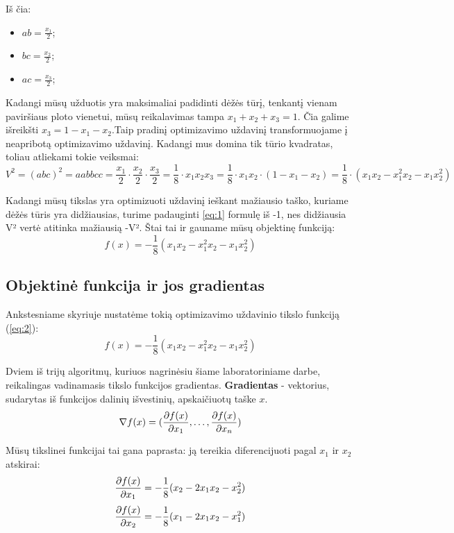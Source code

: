 \documentclass{article}
\begin{document}
Iš čia:
\begin{itemize}
    \item $ab = \frac{x_{1}}{2}$;
    \item $bc = \frac{x_{2}}{2}$;
    \item $ac = \frac{x_{3}}{2}$;
\end{itemize}

Kadangi mūsų užduotis yra maksimaliai padidinti dėžės tūrį, tenkantį vienam paviršiaus ploto vienetui, mūsų reikalavimas tampa $x_{1} + x_{2} + x_{3} = 1$. Čia galime išreikšti $x_{3} = 1 - x_{1} - x_{2}$.Taip pradinį optimizavimo uždavinį transformuojame į neapribotą optimizavimo uždavinį. Kadangi mus domina tik tūrio kvadratas, toliau atliekami tokie veiksmai:
\begin{equation}\label{eq:1}
    V^2 = (abc)^2 = aabbcc = \frac{x_{1}}{2}\cdot \frac{x_{2}}{2}\cdot \frac{x_{3}}{2} = \frac{1}{8}\cdot x_{1}x_{2}x_{3} = \frac{1}{8}\cdot x_{1}x_{2}\cdot (1-x_{1}-x_{2}) = \frac{1}{8}\cdot (x_{1}x_{2}-x_{1}^2x_{2}-x_{1}x_{2}^2)
\end{equation}

Kadangi mūsų tikslas yra optimizuoti uždavinį ieškant mažiausio taško, kuriame dėžės tūris yra didžiausias, turime padauginti \ref{eq:1} formulę iš -1, nes didžiausia V² vertė atitinka mažiausią -V². Štai tai ir gauname mūsų objektinę funkciją:
\begin{equation}\label{eq:2}
    f(x) = -\frac{1}{8}(x_{1}x_{2}-x_{1}^2x_{2}-x_{1}x_{2}^2)
\end{equation}
\subsection{Objektinė funkcija ir jos gradientas}
Ankstesniame skyriuje nustatėme tokią optimizavimo uždavinio tikslo funkciją (\ref{eq:2}):
\begin{equation*}
    f(x) = -\frac{1}{8}(x_{1}x_{2}-x_{1}^2x_{2}-x_{1}x_{2}^2)
\end{equation*}

Dviem iš trijų algoritmų, kuriuos nagrinėsiu šiame laboratoriniame darbe, reikalingas vadinamasis tikslo funkcijos gradientas. \textbf{Gradientas} - vektorius, sudarytas iš funkcijos dalinių išvestinių,
apskaičiuotų taške $x$.
\begin{equation*}
    \nabla f(x) = (\pdv{f(x)}{x_{1}},\dots,\pdv{f(x)}{x_{n}})
\end{equation*}

Mūsų tikslinei funkcijai tai gana paprasta: ją tereikia diferencijuoti pagal $x_{1}$ ir $x_{2}$ atskirai:
\begin{equation*}
    \pdv{f(x)}{x_{1}} = -\frac{1}{8}(x_{2}-2x_{1}x_{2}-x_{2}^2)
\end{equation*}
\begin{equation*}
    \pdv{f(x)}{x_{2}} = -\frac{1}{8}(x_{1}-2x_{1}x_{2}-x_{1}^2)
\end{equation*}
\end{document}
